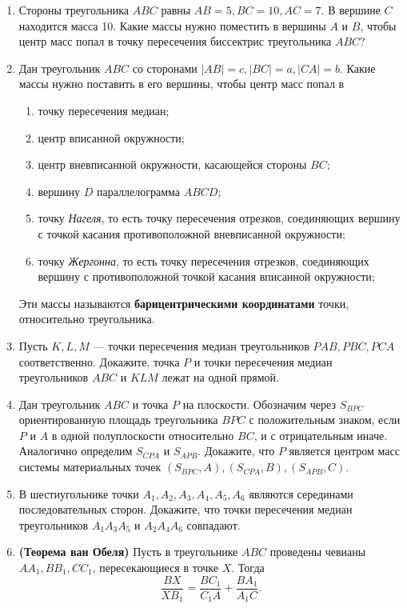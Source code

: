 \documentclass{article}
\begin{document}
\begin{enumerate}[label*=\protect\fbox{\arabic{enumi}}]
\item Стороны треугольника $ABC$ равны $AB=5, BC = 10, AC = 7$. В вершине $C$ находится масса 10. Какие массы нужно поместить в вершины $A$ и $B$, чтобы центр масс попал в точку пересечения биссектрис треугольника $ABC$?

\item Дан треугольник $ABC$ со сторонами $|AB| = c, |BC| = a, |CA| = b$. Какие массы нужно поставить в его вершины, чтобы центр масс попал в
\begin{enumerate}
	\item точку пересечения медиан;
	\item центр вписанной окружности;
	\item центр вневписанной окружности, касающейся стороны $BC$;
	\item вершину $D$ параллелограмма $ABCD$;
	\item точку \textit{Нагеля}, то есть точку пересечения отрезков, соединяющих вершину с точкой касания противоположной вневписанной окружности;
	\item точку \textit{Жергонна}, то есть точку пересечения отрезков, соединяющих вершину с противоположной точкой касания вписанной окружности;
\end{enumerate} 
Эти массы называются \textbf{барицентрическими координатами} точки, относительно треугольника.

\item Пусть $K, L, M$ — точки пересечения медиан треугольников $PAB, PBC, PCA$ соответственно. Докажите, точка $P$ и точки пересечения медиан треугольников $ABC$ и $KLM$ лежат на одной прямой.

\item Дан треугольник $ABC$ и точка $P$ на плоскости. Обозначим через $S_{BPC}$ ориентированную площадь треугольника $BPC$ с положительным знаком, если $P$ и $A$ в одной полуплоскости относительно $BC$, и с отрицательным иначе. Аналогично определим $S_{CPA}$ и $S_{APB}$. Докажите, что $P$ является центром масс системы материальных точек $(S_{BPC},A), (S_{CPA},B), (S_{APB},C)$.

\item В шестиугольнике точки $A_1, A_2, A_3, A_4, A_5, A_6$
являются серединами последовательных сторон. Докажите, что точки пересечения медиан треугольников $A_1A_3A_5$ и $A_2A_4A_6$ совпадают.

\item \textbf{(Теорема ван Обеля)} Пусть в треугольнике $ABC$
проведены чевианы $AA_1, BB_1, CC_1$, пересекающиеся в точке $X$. Тогда
$$\frac{BX}{XB_1}=\frac{BC_1}{C_1A}+\frac{BA_1}{A_1C}.$$


\end{enumerate}
\end{document}
